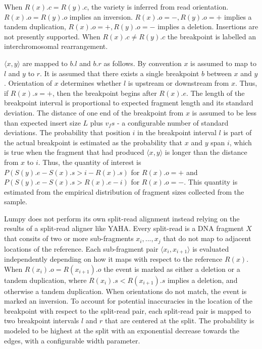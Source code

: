 When $R(x).c = R(y).c$, the variety is inferred from read orientation. $R(x).o = R(y).o$ implies an inversion. $R(x).o = -, R(y).o = +$ implies a tandem duplication, $R(x).o = +, R(y).o = -$ implies a deletion. Insertions are not presently supported. When $R(x).c \ne R(y).c$ the breakpoint is labelled an interchromosomal rearrangement.

$\langle x, y \rangle$ are mapped to $b.l$ and $b.r$ as follows. By convention $x$ is assumed to map to $l$ and $y$ to $r$. It is assumed that there exists a single breakpoint $b$ between $x$ and $y$. Orientation of $x$ determines whether $l$ is upstream or downstream from $x$. Thus, if $R(x).s = +$, then the breakpoint begins after $R(x).e$. The length of the breakpoint interval is proportional to expected fragment length and its standard deviation. The distance of one end of the breakpoint from $x$ is assumed to be less than expected insert size $L$ plus $v_fs$ - a configurable number of standard deviations. The probability that position $i$ in the breakpoint interval $l$ is part of the actual breakpoint is estimated as the probability that $x$ and $y$ span $i$, which is true when the fragment that had produced $\langle x, y \rangle$ is longer than the distance from $x$ to $i$. Thus, the quantity of interest is $P(S(y).e - S(x).s > i - R(x).s)$ for $R(x).o = +$ and $P(S(y).e - S(x).s > R(x).e -i)$ for $R(x).o = -$. This quantity is estimated from the empirical distribution of fragment sizes collected from the sample.

Lumpy does not perform its own split-read alignment instead relying on the results of a split-read aligner like YAHA\autocite{faust2012yaha}. Every split-read is a DNA fragment $X$ that consits of two or more sub-fragments $x_i,...,x_j$ that do not map to adjacent locations of the reference. Each sub-fragment pair $\langle x_i, x_{i+1} \rangle$ is evaluated independently depending on how it maps with respect to the reference $R(x)$. When $R(x_i).o = R(x_{i+1}).o$ the event is marked as either a deletion or a tandem duplication, where $R(x_i).s < R(x_{i+1}).s$ implies a deletion, and otherwise a tandem duplication. When orientations do not match, the event is marked an inversion. To account for potential inaccuracies in the location of the breakpoint with respect to the split-read pair, each split-read pair is mapped to two breakpoint intervals $l$ and $r$ that are centered at the split. The probability is modeled to be highest at the split with an exponential decrease towards the edges, with a configurable width parameter.

